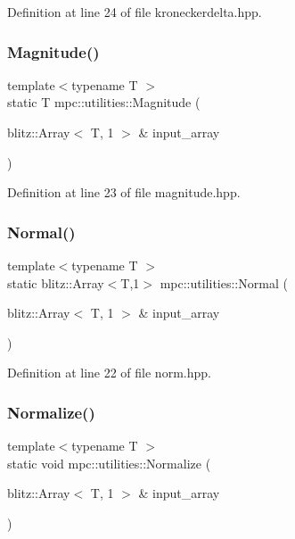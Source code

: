 Definition at line 24 of file kroneckerdelta.\+hpp.

\mbox{\label{namespacempc_1_1utilities_a387fd6b2510b25009905e8121755c207}} 
\subsubsection{\texorpdfstring{Magnitude()}{Magnitude()}}
{\footnotesize\ttfamily template$<$typename T $>$ \\
static T mpc\+::utilities\+::\+Magnitude (\begin{DoxyParamCaption}\item[{blitz\+::\+Array$<$ T, 1 $>$ \&}]{input\+\_\+array }\end{DoxyParamCaption})\hspace{0.3cm}{\ttfamily [static]}}



Definition at line 23 of file magnitude.\+hpp.

\mbox{\label{namespacempc_1_1utilities_acc0a66ea58c515cc13d5a0a79439c639}} 
\subsubsection{\texorpdfstring{Normal()}{Normal()}}
{\footnotesize\ttfamily template$<$typename T $>$ \\
static blitz\+::\+Array$<$T,1$>$ mpc\+::utilities\+::\+Normal (\begin{DoxyParamCaption}\item[{blitz\+::\+Array$<$ T, 1 $>$ \&}]{input\+\_\+array }\end{DoxyParamCaption})\hspace{0.3cm}{\ttfamily [static]}}



Definition at line 22 of file norm.\+hpp.

\mbox{\label{namespacempc_1_1utilities_a2b888b4e5d7d4fe16a1c97c120d0494f}} 
\subsubsection{\texorpdfstring{Normalize()}{Normalize()}}
{\footnotesize\ttfamily template$<$typename T $>$ \\
static void mpc\+::utilities\+::\+Normalize (\begin{DoxyParamCaption}\item[{blitz\+::\+Array$<$ T, 1 $>$ \&}]{input\+\_\+array }\end{DoxyParamCaption})\hspace{0.3cm}{\ttfamily [static]}}



